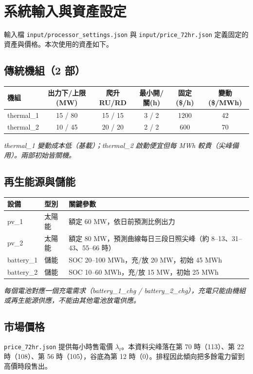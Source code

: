 \documentclass[12pt,a4paper,fontset=none]{ctexart}
\newcommand{\fn}[1]{\texttt{\small #1}}
\begin{document}
\section{系統輸入與資產設定}
輸入檔 \fn{input/processor\_settings.json} 與 \fn{input/price\_72hr.json} 定義固定的資產與價格。本次使用的資產如下。

\subsection{傳統機組（2 部）}
\begin{center}
\begin{tabularx}{\linewidth}{lccccc}
\toprule
\textbf{機組} & \textbf{出力下/上限(MW)} & \textbf{爬升 RU/RD} & \textbf{最小開/關(h)} & \textbf{固定(\$/h)} & \textbf{變動(\$/MWh)} \\
\midrule
thermal\_1 & 15 / 80 & 15 / 15 & 3 / 2 & 1200 & 42 \\
thermal\_2 & 10 / 45 & 20 / 20 & 2 / 2 & 600 & 70 \\
\bottomrule
\end{tabularx}
\end{center}
\noindent\textit{thermal\_1 變動成本低（基載）；thermal\_2 啟動便宜但每 MWh 較貴（尖峰備用）。兩部初始皆關機。}

\subsection{再生能源與儲能}
\begin{center}
\begin{tabularx}{\linewidth}{llX}
\toprule
\textbf{設備} & \textbf{型別} & \textbf{關鍵參數} \\
\midrule
pv\_1 & 太陽能 & 額定 60 MW，依日前預測比例出力 \\
pv\_2 & 太陽能 & 額定 80 MW，預測曲線每日三段日照尖峰（約 8--13、31--43、55--66 時）\\
battery\_1 & 儲能 & SOC 20--100 MWh，充/放 20 MW，初始 45 MWh \\
battery\_2 & 儲能 & SOC 10--60 MWh，充/放 15 MW，初始 25 MWh \\
\bottomrule
\end{tabularx}
\end{center}
\noindent\textit{每個電池對應一個充電需求（battery\_1\_chg / battery\_2\_chg），充電只能由機組或再生能源供應，不能由其他電池放電供應。}

\subsection{市場價格}
\fn{price\_72hr.json} 提供每小時售電價 $\lambda_t$。本資料尖峰落在第 70 時（113）、第 22 時（108）、第 56 時（105），谷底為第 12 時（0）。排程因此傾向把多餘電力留到高價時段售出。
\end{document}
